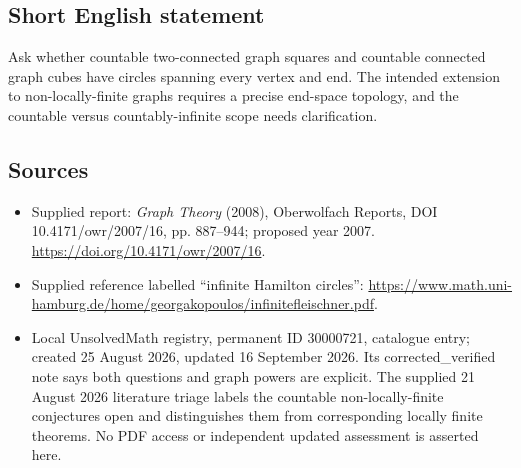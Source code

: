 \documentclass[11pt]{article}
\begin{document}
\subsection{Short English statement}
Ask whether countable two-connected graph squares and countable connected graph cubes have circles spanning every vertex and end. The intended extension to non-locally-finite graphs requires a precise end-space topology, and the countable versus countably-infinite scope needs clarification.
\subsection{Sources}
\begin{itemize}
\item Supplied report: \emph{Graph Theory} (2008), Oberwolfach Reports, DOI 10.4171/owr/2007/16, pp. 887--944; proposed year 2007. \url{https://doi.org/10.4171/owr/2007/16}.
\item Supplied reference labelled ``infinite Hamilton circles'': \url{https://www.math.uni-hamburg.de/home/georgakopoulos/infinitefleischner.pdf}.
\item Local UnsolvedMath registry, permanent ID 30000721, catalogue entry; created 25 August 2026, updated 16 September 2026. Its corrected\_verified note says both questions and graph powers are explicit. The supplied 21 August 2026 literature triage labels the countable non-locally-finite conjectures open and distinguishes them from corresponding locally finite theorems. No PDF access or independent updated assessment is asserted here.
\end{itemize}
\end{document}
